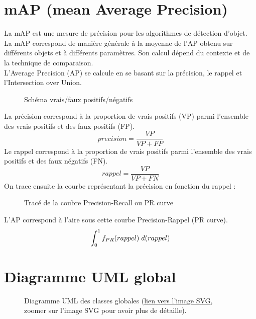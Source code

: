 \begin{appendices}
	
\section*{mAP (mean Average Precision)}\label{app:mAP}
La mAP est une mesure de précision pour les algorithmes de détection d'objet. La mAP correspond de manière générale à la moyenne de l'AP obtenu sur différents objets et à différents paramètres. Son calcul dépend du contexte et de la technique de comparaison.\\
L'Average Precision (AP) se calcule en se basant sur la précision, le rappel et l'Intersection over Union. 
\begin{figure}[!htbp]
\center
\caption{Schéma vrais/faux positifs/négatifs}
\label{fig:schema_vraifaux}
\end{figure}
\FloatBarrier
La précision correspond à la proportion de vrais positifs (VP) parmi l'ensemble des vrais positifs et des faux positifs (FP). 
$$precision = \frac{VP}{VP+FP}$$
Le rappel correspond à la proportion de vrais positifs parmi l'ensemble des vrais positifs et des faux négatifs (FN).
$$rappel = \frac{VP}{VP+FN}$$
On trace ensuite la courbe représentant la précision en fonction du rappel : 
\begin{figure}[!htbp]
\center
\caption{Tracé de la coubre Precision-Recall ou PR curve}
\label{fig:trace_prcurve}
\end{figure}
\FloatBarrier
L'AP correspond à l'aire sous cette courbe Precision-Rappel (PR curve). 
$$\int_{0}^{1} f_{PR}(rappel) \hspace{0.1cm} d(rappel)$$

	

	
\clearpage
\section*{Diagramme UML global}\label{app:UMLGlobal}
\begin{figure}[!htbp]
	\center
	\caption{Diagramme UML des classes globales (\href{https://raw.githubusercontent.com/gabriel-combe/Cuttlefish_Tracker/main/rapport/UML/classes.svg}{lien vers l'image SVG}, zoomer sur l'image SVG pour avoir plus de détaille).}
	\label{fig:uml_diagram_classes}
\end{figure}
\FloatBarrier
	


\end{appendices}

